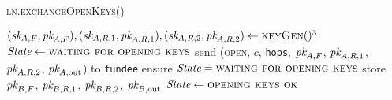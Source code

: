 \begin{center}
  \begin{processbox}{\textsc{ln.exchangeOpenKeys}()}
    \begin{algorithmic}[1]
      \State $(\textit{sk}_{A, F}, \textit{pk}_{A, F}), (\textit{sk}_{A, R, 1}, \textit{pk}_{A, R, 1}), (\textit{sk}_{A, R,
      2}, \textit{pk}_{A, R, 2}) \gets \textsc{keyGen}()^3$
      \State $\itistate \gets \textsc{waiting for opening keys}$
      \State send (\textsc{open}, $c$, \texttt{hops}, $\textit{pk}_{A, F}$, $\textit{pk}_{A, R,
      1}$, $\textit{pk}_{A, R, 2}$, $\textit{pk}_{A, \mathrm{out}}$) to \texttt{fundee}
      \label{code:ln:exchange-open-keys:bob-open}
      \State {}
      \State {}
      \State {}
      \State {}
      \State {}
       
        \State {}
        \State {} 
        \State {}
      \Else \: 
        \State {}
      \EndIf
      \State {}
      \label{code:ln:exchange-open-keys:accept-channel}
      \State ensure $\itistate = \textsc{waiting for opening keys}$
      \State store $\textit{pk}_{B, F}$, $\textit{pk}_{B, R, 1}$, $\textit{pk}_{B, R, 2}$, $\textit{pk}_{B,
      \mathrm{out}}$
      \State $\itistate \gets \textsc{opening keys ok}$
    \end{algorithmic}
  \end{processbox}
  \label{code:ln:exchange-open-keys}
\end{center} \ \\

